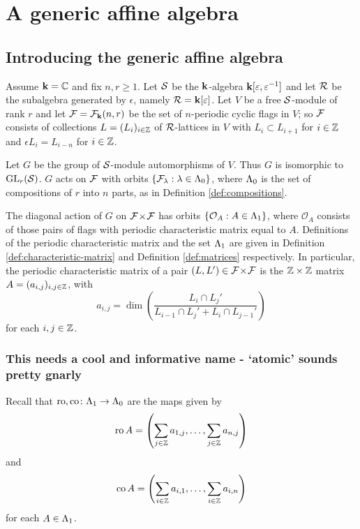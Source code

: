 \documentclass[a4paper, 11pt]{report}
\begin{document}
\chapter{A generic affine algebra}

\section{Introducing the generic affine algebra}

Assume $\mathbf{k} = \mathbb{C}$ and fix $n,r\geq 1$. Let $\mathcal{S}$ be the $\mathbf{k}$-algebra $\mathbf{k}[\varepsilon,\varepsilon^{-1}]$ and let $\mathcal{R}$ be the subalgebra generated by $\epsilon$, namely $\mathcal{R}=\mathbf{k}[\varepsilon]$. Let $V$ be a free $\mathcal{S}$-module of rank $r$ and let $\mathcal{F} = \mathcal{F}_{\mathbf{k}}(n,r)$ be the set of $n$-periodic cyclic flags in $V$; so $\mathcal{F}$ consists of collections $L = (L_i)_{i\in\mathbb{Z}}$ of $\mathcal{R}$-lattices in $V$ with $L_i\subset L_{i+1}$ for $i\in\mathbb{Z}$ and $\epsilon L_i = L_{i-n}$ for $i\in\mathbb{Z}$.

Let $G$ be the group of $\mathcal{S}$-module automorphisms of $V$. Thus $G$ is isomorphic to $\operatorname{GL}_{r}(\mathcal{S})$. $G$ acts on $\mathcal{F}$ with orbits $\{\mathcal{F}_\lambda:\lambda\in{\Lambda_0}\}$, where ${\Lambda_0}$ is the set of compositions of $r$ into $n$ parts, as in Definition \ref{def:compositions}.

The diagonal action of $G$ on ${\mathcal{F}\!\times\!\mathcal{F}}$ has orbits $\{\mathcal{O}_A:A\in{\Lambda_1}\}$, where $\mathcal{O}_A$ consists of those pairs of flags with periodic characteristic matrix equal to $A$. Definitions of the periodic characteristic matrix and the set ${\Lambda_1}$ are given in Definition \ref{def:characteristic-matrix} and Definition \ref{def:matrices} respectively. In particular, the periodic characteristic matrix of a pair $(L,L')\in{\mathcal{F}\!\times\!\mathcal{F}}$ is the $\mathbb{Z}\times\mathbb{Z}$ matrix $A = (a_{i,j})_{i,j\in\mathbb{Z}}$, with
\begin{equation*}
a_{i,j} = \dim\left(\frac{L_i\cap L_j'}{L_{i-1}\cap L_j' + L_i\cap L_{j-1}'}\right)
\end{equation*}
for each $i,j\in\mathbb{Z}$.

\subsection{This needs a cool and informative name - `atomic' sounds pretty gnarly}

Recall that $\operatorname{ro},\operatorname{co}\colon{\Lambda_1}\to{\Lambda_0}$ are the maps given by
\begin{equation*}
\operatorname{ro}{A} = \left(\sum_{j\in\mathbb{Z}} a_{1,j},\ldots, \sum_{j\in\mathbb{Z}}a_{n,j}\right)
\end{equation*}
and
\begin{equation*}
\operatorname{co}{A} = \left(\sum_{i\in\mathbb{Z}} a_{i,1},\ldots, \sum_{i\in\mathbb{Z}} a_{i,n}\right)
\end{equation*}
for each $A\in{\Lambda_1}$.
\end{document}
